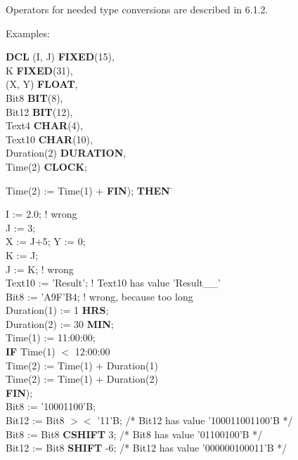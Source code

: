 Operators for needed type conversions are described in 6.1.2.

Examples:

{\bf DCL} (I, J) {\bf FIXED}(15),\\
\x K {\bf FIXED}(31),\\
\x (X, Y) {\bf FLOAT},\\
\x Bit8 {\bf BIT}(8),\\
\x Bit12 {\bf BIT}(12),\\
\x Text4 {\bf CHAR}(4),\\
\x Text10 {\bf CHAR}(10),\\
\x Duration(2) {\bf DURATION},\\
\x Time(2) {\bf CLOCK};

\begin{tabbing}
Time(2) := Time(1) + \= {\bf FIN}); \= {\bf THEN} \= \kill

I := 2.0; \> \> \> ! wrong \\
J := 3;   \> \> \> \\
X := J+5; Y := 0; \> \> \> \\
K := J;   \> \> \> \\
J := K;   \> \> \> ! wrong\\
Text10 := 'Result'; \> \> \> ! Text10 has value 'Result\_\_' \\
Bit8 := 'A9F'B4;    \> \> \>! wrong, because too long \\
Duration(1) := 1 {\bf HRS}; \> \> \>\\
Duration(2) := 30 {\bf MIN}; \> \> \> \\
Time(1) := 11:00:00; \> \> \>\\
{\bf IF} Time(1) $<$ 12:00:00 \> \\
          Time(2) := Time(1) + Duration(1) \> \\
          Time(2) := Time(1) + Duration(2) \> \\
{\bf FIN}); \> \> \\

Bit8 := '10001100'B; \> \> \> \\
Bit12 := Bit8 $><$ '11'B; \> \> \> /* Bit12 has value '100011001100'B */ \\
Bit8 := Bit8 {\bf CSHIFT} 3; \> \> \> /* Bit8 has value '01100100'B */ \\
Bit12 := Bit8 {\bf SHIFT} -6; \> \> \> /* Bit12 has value '000000100011'B */ \\
\end{tabbing}

